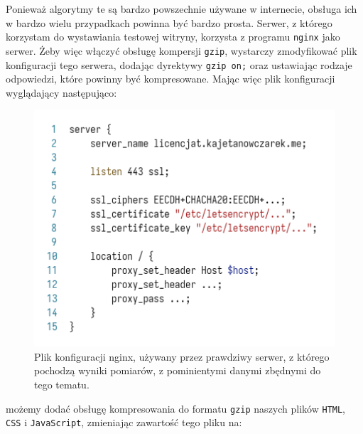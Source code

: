 \documentclass[licencjacka]{pracadypl}
\begin{document}
Ponieważ algorytmy te są bardzo powszechnie używane w internecie, obsługa ich w bardzo wielu przypadkach powinna być bardzo prosta. Serwer, z którego korzystam do wystawiania testowej witryny, korzysta z programu \texttt{nginx} jako serwer. Żeby więc włączyć obsługę kompersji \texttt{gzip}, wystarczy zmodyfikować plik konfiguracji tego serwera, dodając dyrektywy \texttt{gzip on;} oraz ustawiając rodzaje odpowiedzi, które powinny być kompresowane. Mając więc plik konfiguracji wyglądający następująco:
\begin{figure}[H]
  \centering
  \includegraphics[width=\linewidth/\real{1.55}]{images/code-nginx-conf-trunc-nogzip.png}
  \caption{Plik konfiguracji nginx, używany przez prawdziwy serwer, z którego pochodzą wyniki pomiarów, z pominientymi danymi zbędnymi do tego tematu.}
  \label{fig:nginx-before-gzip}
\end{figure}
możemy dodać obsługę kompresowania do formatu \texttt{gzip} naszych plików \texttt{HTML}, \texttt{CSS} i \texttt{JavaScript}, zmieniając zawartość tego pliku na:
\end{document}
